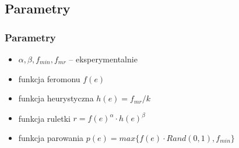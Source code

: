 \documentclass{beamer}
\begin{document}
\subsection{Parametry}

\begin{frame}
\frametitle{Parametry}
\begin{itemize}

\item $\alpha, \beta, f_{min}, f_{mr}$ -- eksperymentalnie
\item funkcja feromonu $f(e)$
\item funkcja heurystyczna $h(e) = f_{mr}/k$
\item funkcja ruletki $r = f(e)^\alpha \cdot h(e)^\beta$ 
\item funkcja parowania $p(e) = max\{f(e) \cdot Rand(0,1), f_{min}\}$

\end{itemize}

\iffalse
1. Dla każdej mrówki wylosuj miasto początkowe \\
2. Niech każda mrówka przejdzie cykl Hamiltona w grafie: startując z miasta początkowego, przejdź do dotychczas nieodwiedzonego miasta posługując się funkcją rulteki, jednocześnie pamiętając dotychczas przebytą trasę. Gdy wszystkie miasta zostały odwiedzone powróć do punktu startowego.
3. Po zakończeniu trasy przez wszystkie mrówki dodaj na krawędzie, przez które przeszły wartość równą odwrotności długości przebytej drogi. \\
4. Jeśli w tej iteracji któraś z mrówek znalazła lepszą ścieżkę, to zapamiętaj to rozwiązanie.\\
5. Feromony na krawędziach przemnóż przez współczynnik parowania.\\
6. Wykasuj pamięć dla każdej z mrówek i zacznij kolejną iterację.\\
\fi

\end{frame}
\end{document}
